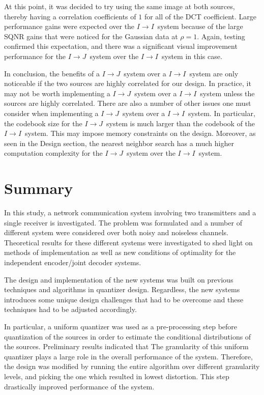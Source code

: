 \documentclass[10pt,twoside,titlepage]{article}
\newcommand{\sysII}{\mbox{$I \rightarrow I$}}
\newcommand{\sysIJ}{\mbox{$I \rightarrow J$}}
\begin{document}
At this point, it was decided to try using the same image at both sources, thereby having a correlation coefficients of $1$ for all of the DCT coefficient. Large performance gains were expected over the \sysII\ system because of the large SQNR gains that were noticed for the Gaussian data at $\rho=1$. Again, testing confirmed this expectation, and there was a significant visual improvement performance for the \sysIJ\ system over the \sysII\ system in this case.

In conclusion, the benefits of a \sysIJ\ system over a \sysII\ system are only noticeable if the two sources are highly correlated for our design. In practice, it may not be worth implementing a \sysIJ\ system over a \sysII\ system unless the sources are highly correlated. There are also a number of other issues one must consider when implementing a \sysIJ\ system over a \sysII\ system. In particular, the codebook size for the \sysIJ\ system is much larger than the codebook of the \sysII\ system. This may impose memory constraints on the design. Moreover, as seen in the Design section, the nearest neighbor search has a much higher computation complexity for the \sysIJ\ system over the \sysII\ system. 

\section{Summary}
In this study, a network communication system involving two transmitters and a single receiver is investigated. The problem was formulated and a number of different system were considered over both noisy and noiseless channels. Theoretical results for these different systems were investigated to shed light on methods of implementation as well as new conditions of optimality for the independent encoder/joint decoder systems.

The design and implementation of the new systems was built on previous techniques and algorithms in quantizer design. Regardless, the new systems introduces some unique design challenges that had to be overcome and these techniques had to be adjusted accordingly.

In particular, a uniform quantizer was used as a pre-processing step before quantization of the sources in order to estimate the conditional distributions of the sources. Preliminary results indicated that The granularity of this uniform quantizer plays a large role in the overall performance of the system. Therefore, the design was modified by running the entire algorithm over different granularity levels, and picking the one which resulted in lowest distortion. This step drastically improved performance of the system.
\end{document}
